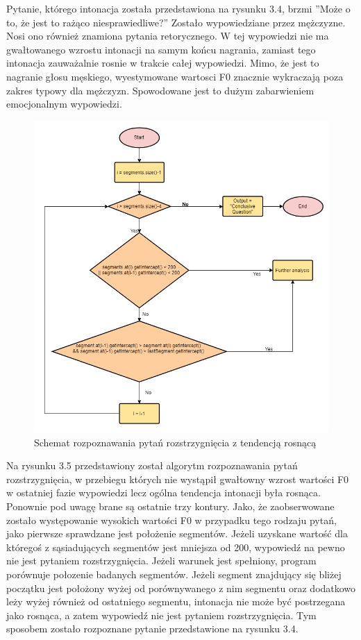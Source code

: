 \documentclass[a4paper,12 pt]{report}
\begin{document}
Pytanie, którego intonacja została przedstawiona na rysunku 3.4, brzmi ''Może o to, że jest to rażąco niesprawiedliwe?'' Zostało wypowiedziane przez mężczyzne. Nosi ono również znamiona pytania retorycznego.  W tej wypowiedzi nie ma gwałtowanego wzrostu intonacji na samym końcu nagrania, zamiast tego intonacja zauważalnie rosnie w trakcie całej wypowiedzi. Mimo, że jest to nagranie głosu męskiego, wyestymowane wartosci F0 znacznie wykraczają poza zakres typowy dla mężczyzn. Spowodowane jest to dużym zabarwieniem emocjonalnym wypowiedzi.
 \FloatBarrier
\begin{figure}[h]
\centering
\includegraphics[scale=0.9]{conclusive2.png}
\caption{Schemat rozpoznawania pytań rozstrzygnięcia z tendencją rosnącą}
\end{figure}
 \FloatBarrier
Na rysunku 3.5 przedstawiony został algorytm rozpoznawania pytań rozstrzygnięcia, w przebiegu których nie wystąpił gwałtowny wzrost wartości F0 w ostatniej fazie wypowiedzi lecz ogólna tendencja intonacji była rosnąca.
Ponownie pod uwagę brane są ostatnie trzy kontury. Jako, że zaobserwowane zostało występowanie wysokich wartości F0 w przypadku tego rodzaju pytań, jako pierwsze sprawdzane jest położenie segmentów. Jeżeli uzyskane wartość dla któregoś z sąsiadujących segmentów jest mniejsza od 200, wypowiedź na pewno nie jest pytaniem rozstrzygnięcia. Jeżeli warunek jest spełniony, program porównuje połozenie badanych segmentów. Jeżeli segment znajdujący się bliżej początku jest położony wyżej od porównywanego z nim segmentu oraz dodatkowo leży wyżej również od ostatniego segmentu, intonacja nie może być postrzegana jako rosnąca, a zatem wypowiedź nie jest pytaniem rozstrzygnięcia. Tym sposobem zostało rozpoznane pytanie przedstawione na rysunku 3.4.
\end{document}
